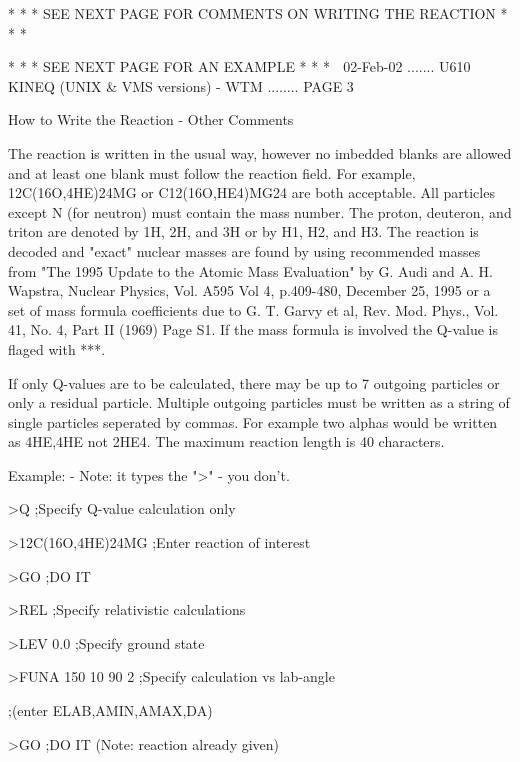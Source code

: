          * * * SEE NEXT PAGE FOR COMMENTS ON WRITING THE REACTION * * *
 
                    * * * SEE NEXT PAGE FOR AN EXAMPLE * * *
    
   02-Feb-02 ....... U610  KINEQ (UNIX & VMS versions) - WTM ........ PAGE   3
 
                   How to Write the Reaction - Other Comments
 
   The  reaction  is  written in the usual way, however no imbedded blanks are
   allowed and at  least  one  blank  must  follow  the  reaction  field.  For
   example,  12C(16O,4HE)24MG  or  C12(16O,HE4)MG24  are  both acceptable. All
   particles except N (for neutron) must contain the mass number. The  proton,
   deuteron,  and  triton  are denoted by 1H, 2H, and 3H or by H1, H2, and H3.
   The reaction is decoded and "exact"  nuclear  masses  are  found  by  using
   recommended  masses  from  "The  1995 Update to the Atomic Mass Evaluation"
   by G. Audi and A. H. Wapstra, Nuclear Physics, Vol. A595 Vol 4,  p.409-480,
   December  25, 1995 or a set of mass formula coefficients due to G. T. Garvy
   et al, Rev. Mod. Phys., Vol. 41, No. 4, Part II  (1969)  Page  S1.  If  the
   mass formula is involved the Q-value is flaged with ***.
 
   If  only  Q-values  are  to  be  calculated,  there may be up to 7 outgoing
   particles or only a residual particle. Multiple outgoing particles must  be
   written  as  a  string of single particles seperated by commas. For example
   two alphas would be written as  4HE,4HE  not  2HE4.  The  maximum  reaction
   length is 40 characters.
 
   Example:   - Note: it types the ">" - you don't.
 
   >Q                              ;Specify Q-value calculation only
 
   >12C(16O,4HE)24MG               ;Enter reaction of interest
 
   >GO                             ;DO IT
 
   >REL                            ;Specify relativistic calculations
 
   >LEV 0.0                        ;Specify ground state
 
   >FUNA 150 10 90 2               ;Specify calculation vs lab-angle
 
                                   ;(enter ELAB,AMIN,AMAX,DA)
 
   >GO                             ;DO IT (Note: reaction already given)
 
